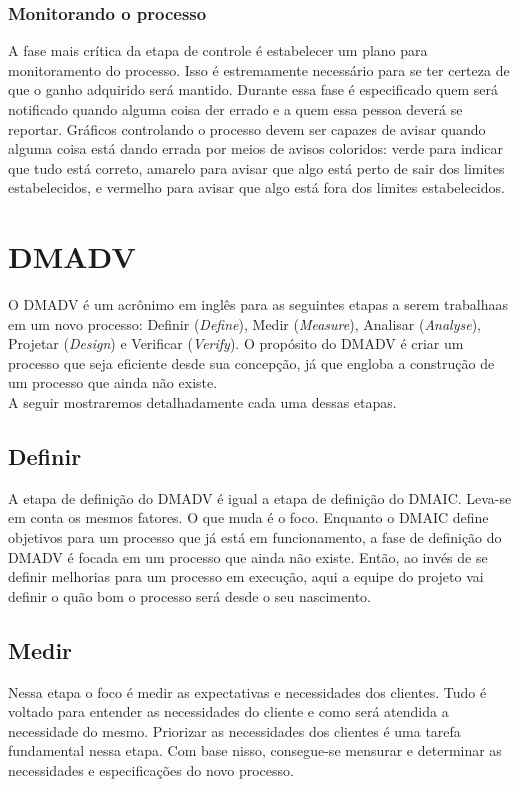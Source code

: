 \documentclass{abnt}
\begin{document}
					\subsubsection {Monitorando o processo}
					A fase mais crítica da etapa de controle é estabelecer um plano para monitoramento do processo. Isso é estremamente 
					necessário para se ter certeza de que o ganho adquirido será mantido. Durante essa fase é especificado quem será 
					notificado quando alguma coisa der errado e a quem essa pessoa deverá se reportar.
					Gráficos controlando o processo devem ser capazes de avisar quando alguma coisa está dando errada por meios de 
					avisos coloridos: verde para indicar que tudo está correto, amarelo para avisar que algo está perto de sair dos limites estabelecidos, 
					e vermelho para avisar que algo está fora dos limites estabelecidos.
			\section {DMADV}
				O DMADV é um acrônimo em inglês para as seguintes etapas a serem trabalhaas em um 
				novo processo: Definir (\textit{Define}), Medir (\textit{Measure}), 
				Analisar (\textit{Analyse}), Projetar (\textit{Design}) e Verificar (\textit{Verify}).
				O propósito do DMADV é criar um processo que seja eficiente desde sua concepção, já que engloba a 
				construção de um processo que ainda não existe.
				\\
				A seguir mostraremos detalhadamente cada uma dessas etapas.
				\subsection {Definir}
				A etapa de definição do DMADV é igual a etapa de definição do DMAIC. Leva-se em conta os mesmos fatores.
				O que muda é o foco. Enquanto o DMAIC define objetivos para um processo que já está em funcionamento, 
				a fase de definição do DMADV é focada em um processo que ainda não existe. Então, ao invés de se definir 
				melhorias para um processo em execução, aqui a equipe do projeto vai definir o quão bom o processo será desde 
				o seu nascimento.
				\subsection {Medir}
				Nessa etapa o foco é medir as expectativas e necessidades dos clientes. Tudo é voltado para 
				entender as necessidades do cliente e como será atendida a necessidade do mesmo.
				Priorizar as necessidades dos clientes é uma tarefa fundamental nessa etapa.
				Com base nisso, consegue-se mensurar e determinar as necessidades e especificações do novo processo.
\end{document}
